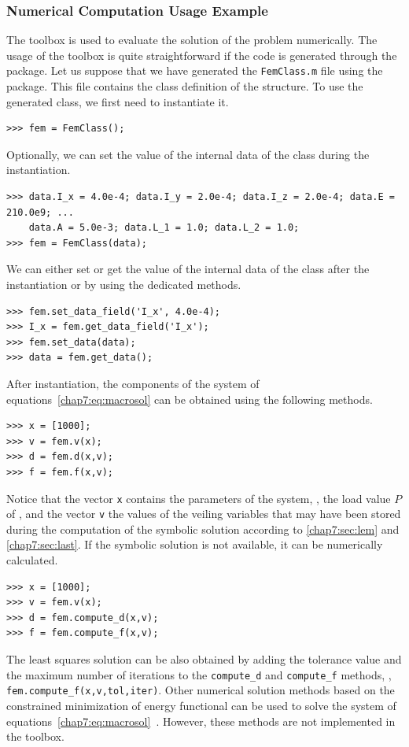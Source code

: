 \subsubsection*{\TrussMe{} Numerical Computation Usage Example}

The \TrussMe{} \Matlab{} toolbox is used to evaluate the solution of the problem numerically. The usage of the toolbox is quite straightforward if the code is generated through the \TrussMe{} \Maple{} package. Let us suppose that we have generated the \texttt{FemClass.m} file using the \TrussMe{} \Maple{} package. This file contains the class definition of the structure. To use the generated class, we first need to instantiate it.
%
\begin{verbatim}
>>> fem = FemClass();
\end{verbatim}
%
Optionally, we can set the value of the internal data of the class during the instantiation.
%
\begin{verbatim}
>>> data.I_x = 4.0e-4; data.I_y = 2.0e-4; data.I_z = 2.0e-4; data.E = 210.0e9; ...
    data.A = 5.0e-3; data.L_1 = 1.0; data.L_2 = 1.0;
>>> fem = FemClass(data);
\end{verbatim}
%
We can either set or get the value of the internal data of the class after the instantiation or by using the dedicated methods.
%
\begin{verbatim}
>>> fem.set_data_field('I_x', 4.0e-4);
>>> I_x = fem.get_data_field('I_x');
>>> fem.set_data(data);
>>> data = fem.get_data();
\end{verbatim}
%
After instantiation, the components of the system of equations~\eqref{chap7:eq:macrosol} can be obtained using the following methods.
%
\begin{verbatim}
>>> x = [1000];
>>> v = fem.v(x);
>>> d = fem.d(x,v);
>>> f = fem.f(x,v);
\end{verbatim}
%
Notice that the vector \texttt{x} contains the parameters of the system, \eg{}, the load value $P$ of , and the vector \texttt{v} the values of the veiling variables that may have been stored during the computation of the symbolic solution according to \ref{chap7:sec:lem} and \ref{chap7:sec:last}. If the symbolic solution is not available, it can be numerically calculated.
%
\begin{verbatim}
>>> x = [1000];
>>> v = fem.v(x);
>>> d = fem.compute_d(x,v);
>>> f = fem.compute_f(x,v);
\end{verbatim}
%
The least squares solution can be also obtained by adding the tolerance value and the maximum number of iterations to the \texttt{compute\_d} and \texttt{compute\_f} methods, \eg{}, \texttt{fem.compute\_f(x,v,tol,iter)}. Other numerical solution methods based on the constrained minimization of energy functional can be used to solve the system of equations~\eqref{chap7:eq:macrosol}~\cite{hutton2004fundamentals}. However, these methods are not implemented in the \TrussMe{} \Matlab{} toolbox.


